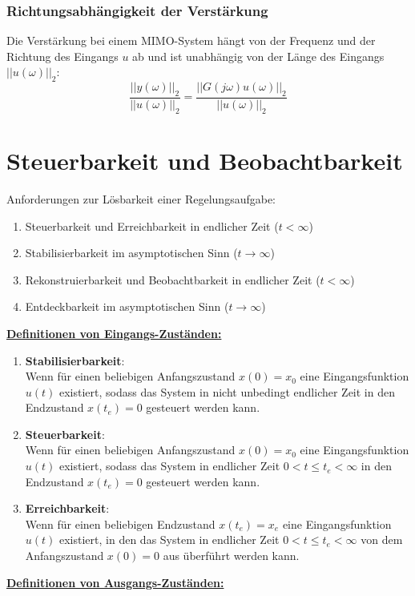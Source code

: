 \documentclass[a4paper,twocolumn,10pt]{article}
\begin{document}
\subsubsection{Richtungsabhängigkeit der Verstärkung}
Die Verstärkung bei einem MIMO-System hängt von der Frequenz und der Richtung des Eingangs $u$ ab und ist unabhängig von der Länge des Eingangs $||u(\omega)||_2$:
\begin{equation*}
\frac{||y(\omega)||_2}{||u(\omega)||_2}=\frac{||G(j\omega)u(\omega)||_2}{||u(\omega)||_2}
\end{equation*}

\section{Steuerbarkeit und Beobachtbarkeit}
Anforderungen zur Lösbarkeit einer Regelungsaufgabe:
\begin{enumerate}
\item Steuerbarkeit und Erreichbarkeit in endlicher Zeit ($t<\infty$)
\item Stabilisierbarkeit im asymptotischen Sinn ($t\rightarrow\infty$)
\item Rekonstruierbarkeit und Beobachtbarkeit in endlicher Zeit ($t<\infty$)
\item Entdeckbarkeit im asymptotischen Sinn ($t\rightarrow\infty$)
\end{enumerate}
\underline{\textbf{Definitionen von Eingangs-Zuständen:}}
\begin{enumerate}[label=$\bullet$]
\item \textbf{Stabilisierbarkeit}:\\
Wenn für einen beliebigen Anfangszustand $x(0)=x_0$ eine Eingangsfunktion $u(t)$ existiert, sodass das System in nicht unbedingt endlicher Zeit in den Endzustand $x(t_e)=0$ gesteuert werden kann.
\item \textbf{Steuerbarkeit}:\\
Wenn für einen beliebigen Anfangszustand $x(0)=x_0$ eine Eingangsfunktion $u(t)$ existiert, sodass das System in endlicher Zeit $0<t\leq t_e<\infty$ in den Endzustand $x(t_e)=0$ gesteuert werden kann.
\item \textbf{Erreichbarkeit}:\\
Wenn für einen beliebigen Endzustand $x(t_e)=x_e$ eine Eingangsfunktion $u(t)$ existiert, in den das System in endlicher Zeit $0<t\leq t_e<\infty$ von dem Anfangszustand $x(0)=0$ aus überführt werden kann.
\end{enumerate}
\underline{\textbf{Definitionen von Ausgangs-Zuständen:}}
\end{document}
